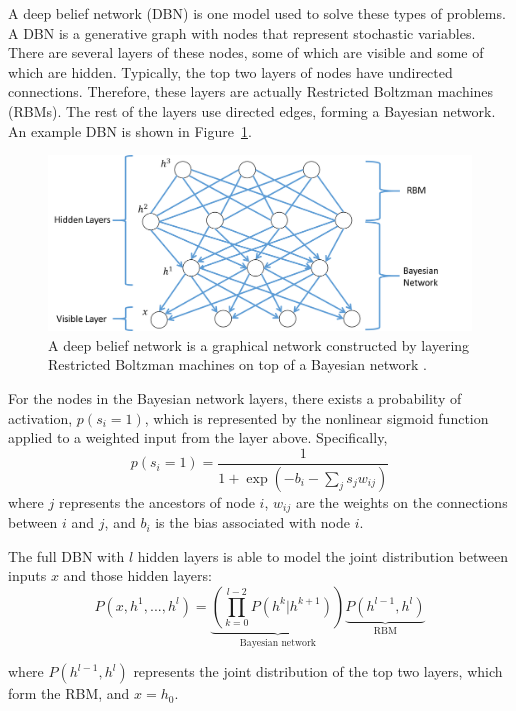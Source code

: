 \documentclass[12pt]{report}
\begin{document}
A deep belief network (DBN) is one model used to solve these types of problems. 
A DBN is a generative graph with nodes that represent stochastic variables.
There are several layers of these nodes, some of which are visible and some of which are hidden.
Typically, the top two layers of nodes have undirected connections.
Therefore, these layers are actually Restricted Boltzman machines (RBMs).
The rest of the layers use directed edges, forming a Bayesian network.
An example DBN is shown in Figure~\ref{fig:DBN}.

\begin{figure}[t]
    \centering
        \includegraphics[width=.7\columnwidth,trim={0mm 0mm 0mm 0mm},clip]{dbn}
        \vspace{-7pt}
        \caption[The Components of a Deep Belief Network]{A deep belief network is a graphical network constructed by layering Restricted Boltzman machines on top of a Bayesian network \cite{hinton_fast_2006}.}
        \label{fig:DBN}
\end{figure}

For the nodes in the Bayesian network layers, there exists a probability of activation, $p(s_i=1)$, which is represented by the nonlinear sigmoid function applied to a weighted input from the layer above.
Specifically,
\begin{equation}
p(s_i=1) = \frac{1}{1+\exp \left(-b_i-\sum_j s_j w_{ij}\right)}
\end{equation}
where $j$ represents the ancestors of node $i$, $w_{ij}$ are the weights on the connections between $i$ and $j$, and $b_i$ is the bias associated with node $i$.

The full DBN with $l$ hidden layers is able to model the joint distribution between inputs $x$ and those hidden layers:
\begin{equation}
P(x, h^1, ..., h^l) = \underbrace{\left(\prod_{k=0}^{l-2}P(h^k|h^{k+1}) \right)}_{\text{Bayesian network}} \underbrace{P(h^{l-1},h^l)}_{\text{RBM}}
\end{equation}

where $P(h^{l-1},h^l)$ represents the joint distribution of the top two layers, which form the RBM, and $x = h_0$.
\end{document}
